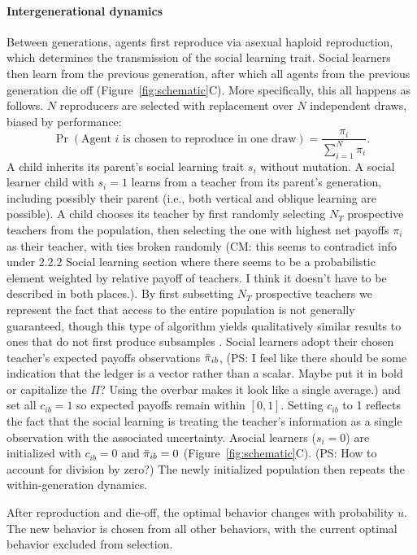 \documentclass[letterpaper,11.5pt]{scrartcl}
\newcommand{\cm}[1]{{\textcolor{mypurple} {({\tiny CM:} #1)}}}
\newcommand{\ps}[1]{{\textcolor{mygreen} {({\tiny PS:} #1)}}}
\begin{document}
\paragraph{Intergenerational dynamics}
Between generations, agents first reproduce via asexual haploid reproduction, which determines the transmission of the social learning trait. Social learners then learn from the
previous generation, after which all agents from the
previous generation die off (Figure~\ref{fig:schematic}C). More specifically, this all happens as follows. 
$N$ reproducers are selected with replacement over $N$ independent draws, 
biased by performance:
\begin{equation}
  \Pr(\text{Agent $i$ is chosen to reproduce in one draw}) = \frac{\pi_i}{\sum_{i=1}^N \pi_i}.
\end{equation}
\noindent
A child inherits its parent's social learning trait $s_i$ without mutation.
A social learner child with $s_i = 1$ learns from a teacher from its parent's
generation, including possibly their parent (i.e., both vertical and oblique learning are possible). 
A child chooses its teacher by first randomly selecting $N_T$ prospective
teachers from the population, then selecting the one with
highest net payoffs $\pi_i$ as their teacher, with ties broken randomly \cm{this seems to contradict info under 2.2.2 Social learning section where there seems to be a probabilistic element weighted by relative payoff of teachers. I think it doesn't have to be described in both places.}. By first subsetting $N_T$ prospective teachers we represent the fact that access to the entire population is not generally guaranteed, though this type of algorithm yields qualitatively similar results to ones that do not first produce subsamples \cite{smaldino2019open}. 
Social learners adopt their chosen teacher's expected payoffs observations $\bar\pi_{ib}$, \ps{I feel like there should be some indication that the ledger is a vector rather than a scalar. Maybe put it in bold or capitalize the $\Pi$? Using the overbar makes it look like a single average.}
and set all $c_{ib} = 1$ so expected payoffs remain within $[0, 1]$. Setting $c_{ib}$ to 1 reflects the fact that the social learning is treating the teacher's information as a single observation with the associated uncertainty.   Asocial
learners ($s_i = 0$) are initialized with $c_{ib} = 0$ and $\bar\pi_{ib} = 0$ 
(Figure~\ref{fig:schematic}C). \ps{How to account for division by zero?} The
newly initialized population then repeats the within-generation dynamics. 

After reproduction and die-off, the optimal behavior changes with probability
$u$. The new behavior is chosen from all other behaviors, with the 
current optimal behavior excluded from selection.
\end{document}
